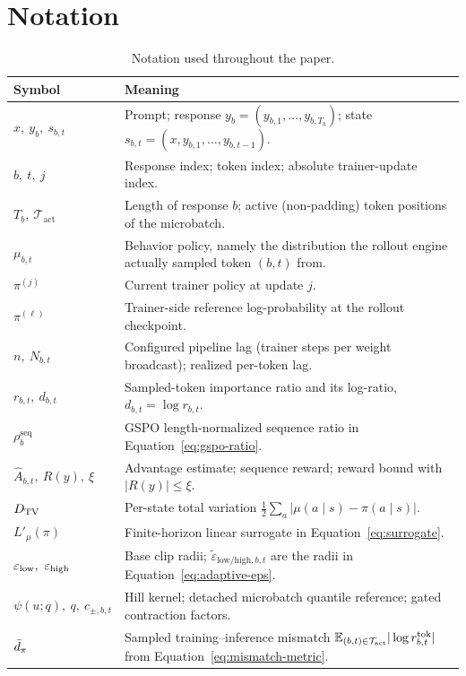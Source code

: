 
\section{Notation}
\label{app:notation}

\begin{table}[h]
\centering
\caption{Notation used throughout the paper.}
\label{tab:notation}
\small
\setlength{\tabcolsep}{6pt}
\begin{tabular}{@{}ll@{}}
\toprule
Symbol & Meaning \\
\midrule
$x,\ y_b,\ s_{b,t}$ & Prompt; response $y_b=(y_{b,1},\dots,y_{b,T_b})$; state $s_{b,t}=(x,y_{b,1},\dots,y_{b,t-1})$. \\
$b,\ t,\ j$ & Response index; token index; absolute trainer-update index. \\
$T_b,\ \mathcal T_{\mathrm{act}}$ & Length of response $b$; active (non-padding) token positions of the microbatch. \\
$\mu_{b,t}$ & Behavior policy, namely the distribution the rollout engine actually sampled token $(b,t)$ from. \\
$\pi^{(j)}$ & Current trainer policy at update $j$. \\
$\pi^{(\ell)}$ & Trainer-side reference log-probability at the rollout checkpoint. \\
$n,\ N_{b,t}$ & Configured pipeline lag (trainer steps per weight broadcast); realized per-token lag. \\
$r_{b,t},\ d_{b,t}$ & Sampled-token importance ratio and its log-ratio, $d_{b,t}=\log r_{b,t}$. \\
$\rho^{\mathrm{seq}}_b$ & GSPO length-normalized sequence ratio in Equation~\eqref{eq:gspo-ratio}. \\
$\hat A_{b,t},\ R(y),\ \xi$ & Advantage estimate; sequence reward; reward bound with $|R(y)|\le\xi$. \\
$D_{\mathrm{TV}}$ & Per-state total variation $\tfrac12\sum_a|\mu(a\mid s)-\pi(a\mid s)|$. \\
$L'_{\mu}(\pi)$ & Finite-horizon linear surrogate in Equation~\eqref{eq:surrogate}. \\
$\elow,\ \ehigh$ & Base clip radii; $\tilde\varepsilon_{\mathrm{low}/\mathrm{high},b,t}$ are the \satr{} radii in Equation~\eqref{eq:adaptive-eps}. \\
$\psi(u;q),\ q,\ c_{\pm,b,t}$ & Hill kernel; detached microbatch quantile reference; gated contraction factors. \\
$\bar d_\pi$ & Sampled training--inference mismatch $\mathbb{E}_{(b,t)\in\mathcal T_{\mathrm{act}}}|\log r^{\mathrm{tok}}_{b,t}|$ from Equation~\eqref{eq:mismatch-metric}. \\
\bottomrule
\end{tabular}
\end{table}


